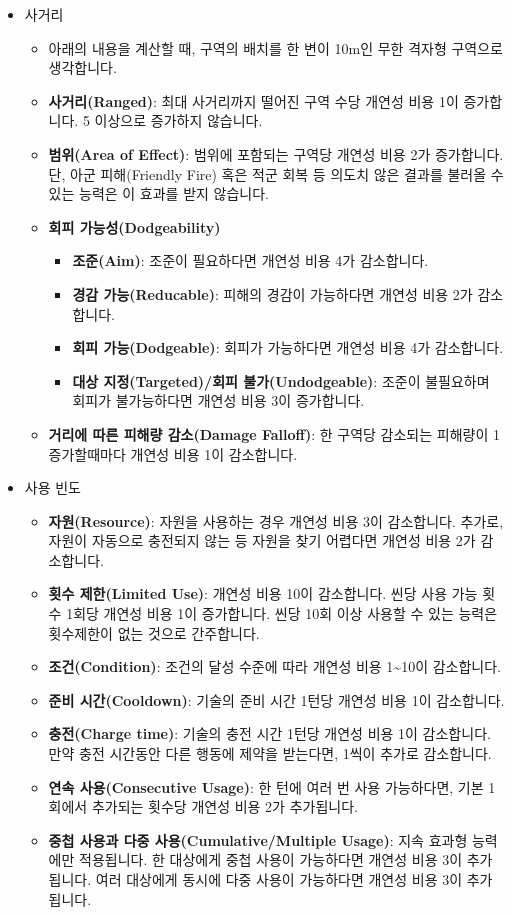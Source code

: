 \documentclass{report}
\begin{document}
\begin{itemize}
		\item 사거리
		\begin{itemize}
			\item 아래의 내용을 계산할 때, 구역의 배치를 한 변이 10m인 무한 격자형 구역으로 생각합니다.
			\item \textbf{사거리(Ranged)}: 최대 사거리까지 떨어진 구역 수당 개연성 비용 1이 증가합니다. 5 이상으로 증가하지 않습니다.
			\item \textbf{범위(Area of Effect)}: 범위에 포함되는 구역당 개연성 비용 2가 증가합니다. 단, 아군 피해(Friendly Fire) 혹은 적군 회복 등 의도치 않은 결과를 불러올 수 있는 능력은 이 효과를 받지 않습니다.
			\item \textbf{회피 가능성(Dodgeability)}
				\begin{itemize}
					\item \textbf{조준(Aim)}: 조준이 필요하다면 개연성 비용 4가 감소합니다.
					\item \textbf{경감 가능(Reducable)}: 피해의 경감이 가능하다면 개연성 비용 2가 감소합니다.
					\item \textbf{회피 가능(Dodgeable)}: 회피가 가능하다면 개연성 비용 4가 감소합니다.
					\item \textbf{대상 지정(Targeted)/회피 불가(Undodgeable)}: 조준이 불필요하며 회피가 불가능하다면 개연성 비용 3이 증가합니다.
				\end{itemize}
			\item \textbf{거리에 따른 피해량 감소(Damage Falloff)}: 한 구역당 감소되는 피해량이 1 증가할때마다 개연성 비용 1이 감소합니다.
		\end{itemize}
		
		\item 사용 빈도
		\begin{itemize}
			\item \textbf{자원(Resource)}: 자원을 사용하는 경우 개연성 비용 3이 감소합니다. 추가로, 자원이 자동으로 충전되지 않는 등 자원을 찾기 어렵다면 개연성 비용 2가 감소합니다.
			\item \textbf{횟수 제한(Limited Use)}: 개연성 비용 10이 감소합니다. 씬당 사용 가능 횟수 1회당 개연성 비용 1이 증가합니다. 씬당 10회 이상 사용할 수 있는 능력은 횟수제한이 없는 것으로 간주합니다.
			\item \textbf{조건(Condition)}: 조건의 달성 수준에 따라 개연성 비용 1\textasciitilde10이 감소합니다.
			\item \textbf{준비 시간(Cooldown)}: 기술의 준비 시간 1턴당 개연성 비용 1이 감소합니다.
			\item \textbf{충전(Charge time)}: 기술의 충전 시간 1턴당 개연성 비용 1이 감소합니다. 만약 충전 시간동안 다른 행동에 제약을 받는다면, 1씩이 추가로 감소합니다.
			\item \textbf{연속 사용(Consecutive Usage)}: 한 턴에 여러 번 사용 가능하다면, 기본 1회에서 추가되는 횟수당 개연성 비용 2가 추가됩니다.
			\item \textbf{중첩 사용과 다중 사용(Cumulative/Multiple Usage)}: 지속 효과형 능력에만 적용됩니다. 한 대상에게 중첩 사용이 가능하다면 개연성 비용 3이 추가됩니다. 여러 대상에게 동시에 다중 사용이 가능하다면 개연성 비용 3이 추가됩니다.
		\end{itemize}
		

\end{itemize}
\end{document}
